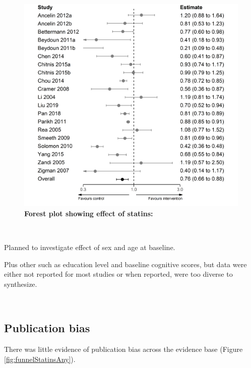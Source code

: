 \documentclass[a4paper, twoside]{templates/ociamthesis}
\begin{document}
\begin{figure}[H]
\includegraphics[width=1\linewidth]{figures/sys-rev/forester_statins_any} \caption[Forest plot showing effect of statins]{\textbf{Forest plot showing effect of statins:}}\label{fig:lipidsDoseResponse}
\end{figure}

~

Planned to investigate effect of sex and age at baseline.

Plus other such as education level and baseline cognitive scores, but data were either not reported for most studies or when reported, were too diverse to synthesize.

~

\hypertarget{sys-rev-pub-bias}{%
\subsection{Publication bias}\label{sys-rev-pub-bias}}

There was little evidence of publication bias across the evidence base (Figure \ref{fig:funnelStatinsAny}).

~
\end{document}
